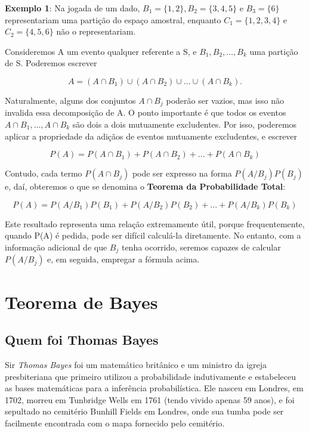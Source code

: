 \documentclass[a4paper,12pt]{report}
\begin{document}
{\textbf{Exemplo 1}: Na jogada de um dado,
$B_{1}=\{1,2\},B_{2}=\{3,4,5 \}$ e $B_{3}=\{6\}$ representariam
uma partição do espaço amostral, enquanto $C_{1}=\{1,2,3,4\}$ e
$C_{2}=\{4,5,6 \}$ não o representariam.\vskip0.3cm

Consideremos A um evento qualquer referente a S, e
$B_{1},B_{2},...,B_{k}$ uma partição de S. Poderemos escrever

$$
A = (A \cap B_{1}) \cup (A \cap B_{2}) \cup ... \cup (A \cap
B_{k}).
$$

Naturalmente, alguns dos conjuntos $A \cap B_{j}$ poderão ser
vazios, mas isso não invalida essa decomposição de A. O ponto
importante é que todos os eventos $A \cap B_{1},...,A \cap B_{k}$
são dois a dois mutuamente excludentes. Por isso, poderemos
aplicar a propriedade da adiçãos de eventos mutuamente
excludentes, e escrever


$$
P(A)=P(A\cap B_{1})+P(A\cap B_{2})+...+P(A\cap B_{k})
$$

Contudo, cada termo $P(A\cap B_{j})$ pode ser expresso na forma
$P(A/B_{j})P(B_{j})$ e, daí, obteremos o que se denomina o
\textbf{Teorema da Probabilidade Total}:

\begin{equation}\label{}
P(A)=P(A/B_{1})P(B_{1})+P(A/B_{2})P(B_{2})+...+P(A/B_{k})P(B_{k})
\end{equation}

Este resultado representa uma relação extremamente útil, porque
frequentemente, quando P(A) é pedida, pode ser difícil calculá-la
diretamente. No entanto, com a informação adicional de que $B_{j}$
tenha ocorrido, seremos capazes de calcular $P(A/B_{j})$ e, em
seguida, empregar a fórmula acima.









\section{Teorema de Bayes}
\subsection{Quem foi Thomas Bayes}

Sir \emph{Thomas Bayes} foi um matemático britânico e um ministro
da igreja presbiteriana que primeiro utilizou a probabilidade
indutivamente e estabeleceu as bases matemáticas para a inferência
probabilística. Ele nasceu em Londres, em 1702, morreu em
Tunbridge Wells em 1761 (tendo vivido apenas 59 anos), e foi
sepultado no cemitério Bunhill Fields em Londres, onde sua tumba
pode ser facilmente encontrada com o mapa fornecido pelo
cemitério.\vskip0.3cm

}
\end{document}
